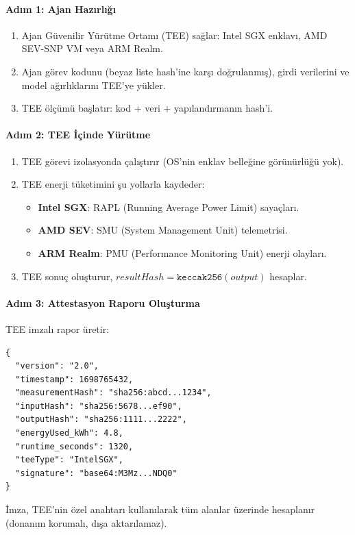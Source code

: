 \documentclass[11pt]{article}
\begin{document}
\begin{itemize}[noitemsep]
\begin{itemize}[noitemsep]
\begin{itemize}[noitemsep]
\begin{itemize}[noitemsep]
\begin{itemize}[noitemsep]
\begin{itemize}[noitemsep]
\begin{itemize}[noitemsep]
\begin{enumerate}[noitemsep]
\paragraph{Adım 1: Ajan Hazırlığı}
\begin{enumerate}[noitemsep]
  \item Ajan Güvenilir Yürütme Ortamı (TEE) sağlar: Intel SGX enklavı, AMD SEV-SNP VM veya ARM Realm.
  \item Ajan görev kodunu (beyaz liste hash'ine karşı doğrulanmış), girdi verilerini ve model ağırlıklarını TEE'ye yükler.
  \item TEE ölçümü başlatır: kod + veri + yapılandırmanın hash'i.
\end{enumerate}

\paragraph{Adım 2: TEE İçinde Yürütme}
\begin{enumerate}[noitemsep]
  \item TEE görevi izolasyonda çalıştırır (OS'nin enklav belleğine görünürlüğü yok).
  \item TEE enerji tüketimini şu yollarla kaydeder:
    \begin{itemize}[noitemsep]
      \item \textbf{Intel SGX}: RAPL (Running Average Power Limit) sayaçları.
      \item \textbf{AMD SEV}: SMU (System Management Unit) telemetrisi.
      \item \textbf{ARM Realm}: PMU (Performance Monitoring Unit) enerji olayları.
    \end{itemize}
  \item TEE sonuç oluşturur, $resultHash = \texttt{keccak256}(output)$ hesaplar.
\end{enumerate}

\paragraph{Adım 3: Attestasyon Raporu Oluşturma}
TEE imzalı rapor üretir:
\begin{verbatim}
{
  "version": "2.0",
  "timestamp": 1698765432,
  "measurementHash": "sha256:abcd...1234",
  "inputHash": "sha256:5678...ef90",
  "outputHash": "sha256:1111...2222",
  "energyUsed_kWh": 4.8,
  "runtime_seconds": 1320,
  "teeType": "IntelSGX",
  "signature": "base64:M3Mz...NDQ0"
}
\end{verbatim}
İmza, TEE'nin özel anahtarı kullanılarak tüm alanlar üzerinde hesaplanır (donanım korumalı, dışa aktarılamaz).


\end{enumerate}
\end{itemize}
\end{itemize}
\end{itemize}
\end{itemize}
\end{itemize}
\end{itemize}
\end{itemize}
\end{document}
